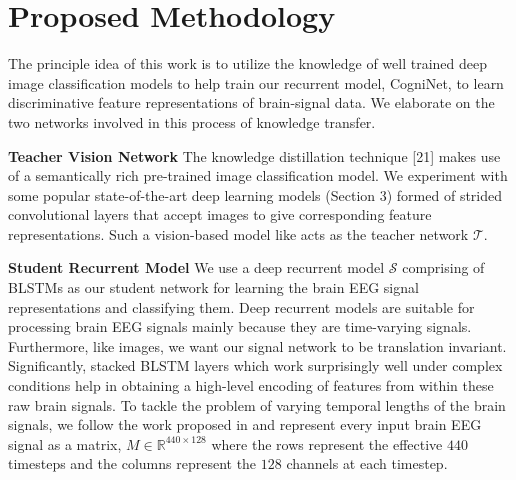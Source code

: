 \documentclass{article}
\begin{document}
\section{Proposed Methodology}
\label{sec:approach}
The principle idea of this work is to utilize the knowledge of well trained deep image classification models to help train our recurrent model, CogniNet, to learn discriminative feature representations of brain-signal data. We elaborate on the two networks involved in this process of knowledge transfer. 

\textbf{Teacher Vision Network}
The knowledge distillation technique [21] makes use of a semantically rich pre-trained image classification model. We experiment with some popular state-of-the-art deep learning models (Section 3) formed of strided convolutional layers that accept images to give corresponding feature representations. Such a vision-based model like \cite{krizhevsky2012imagenet,szegedy2015going,simonyan2014very} acts as the teacher network $\mathcal{T}$. 

\textbf{Student Recurrent Model}
We use a deep recurrent model $\mathcal{S}$ comprising of BLSTMs as our student network for learning the brain EEG signal representations and classifying them. Deep recurrent models are suitable for processing brain EEG signals mainly because they are time-varying signals. Furthermore, like images, we want our signal network to be translation invariant. Significantly, stacked BLSTM layers which work surprisingly well under complex conditions \cite{spampinato2017deep} help in obtaining a high-level encoding of features from within these raw brain signals. To tackle the problem of varying temporal lengths of the brain signals, we follow the work proposed in \cite{spampinato2017deep} and represent every input brain EEG signal as a matrix, $M \in \mathbb{R}^{440\times128}$ where the rows represent the effective $440$ timesteps and the columns represent the $128$ channels \cite{spampinato2017deep} at each timestep.
\end{document}
